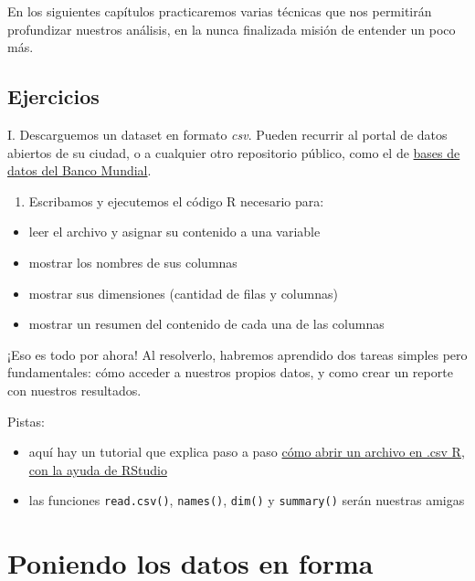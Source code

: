 \documentclass[
]{book}
\providecommand{\tightlist}{%
  \setlength{\itemsep}{0pt}\setlength{\parskip}{0pt}}
\begin{document}
En los siguientes capítulos practicaremos varias técnicas que nos permitirán profundizar nuestros análisis, en la nunca finalizada misión de entender un poco más.

\hypertarget{ejercicios}{%
\section{Ejercicios}\label{ejercicios}}

I. Descarguemos un dataset en formato \emph{csv}. Pueden recurrir al portal de datos abiertos de su ciudad, o a cualquier otro repositorio público, como el de \href{https://databank.bancomundial.org/databases}{bases de datos del Banco Mundial}.

\begin{enumerate}
\def\labelenumi{\Roman{enumi}.}
\setcounter{enumi}{1}
\tightlist
\item
  Escribamos y ejecutemos el código R necesario para:
\end{enumerate}

\begin{itemize}
\tightlist
\item
  leer el archivo y asignar su contenido a una variable
\item
  mostrar los nombres de sus columnas
\item
  mostrar sus dimensiones (cantidad de filas y columnas)
\item
  mostrar un resumen del contenido de cada una de las columnas
\end{itemize}

¡Eso es todo por ahora! Al resolverlo, habremos aprendido dos tareas simples pero fundamentales: cómo acceder a nuestros propios datos, y como crear un reporte con nuestros resultados.

Pistas:

\begin{itemize}
\tightlist
\item
  aquí hay un tutorial que explica paso a paso \href{https://rpubs.com/HAVB/importar_datos}{cómo abrir un archivo en .csv R, con la ayuda de RStudio}
\item
  las funciones \texttt{read.csv()}, \texttt{names()}, \texttt{dim()} y \texttt{summary()} serán nuestras amigas
\end{itemize}

\hypertarget{poniendo-los-datos-en-forma}{%
\chapter{Poniendo los datos en forma}\label{poniendo-los-datos-en-forma}}
\end{document}

